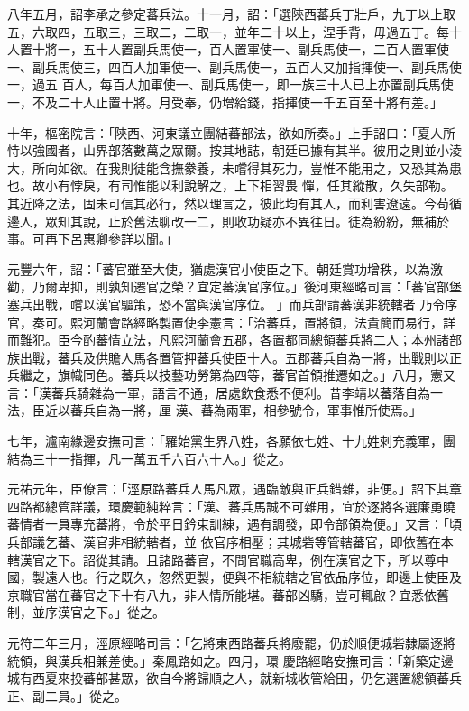 \begin{pinyinscope}
 八年五月，詔李承之參定蕃兵法。十一月，詔：「選陝西蕃兵丁壯戶，九丁以上取五，六取四，五取三，三取二，二取一，並年二十以上，涅手背，毋過五丁。每十人置十將一，五十人置副兵馬使一，百人置軍使一、副兵馬使一，二百人置軍使一、副兵馬使三，四百人加軍使一、副兵馬使一，五百人又加指揮使一、副兵馬使一，過五
 百人，每百人加軍使一、副兵馬使一，即一族三十人已上亦置副兵馬使一，不及二十人止置十將。月受奉，仍增給錢，指揮使一千五百至十將有差。」



 十年，樞密院言：「陝西、河東議立團結蕃部法，欲如所奏。」上手詔曰：「夏人所恃以強國者，山界部落數萬之眾爾。按其地誌，朝廷已據有其半。彼用之則並小淩大，所向如欲。在我則徒能含撫豢養，未嚐得其死力，豈惟不能用之，又恐其為患也。故小有悖戾，有司惟能以利說解之，上下相習畏
 憚，任其縱散，久失部勒。其近降之法，固未可信其必行，然以理言之，彼此均有其人，而利害遼遠。今苟循邊人，眾知其說，止於舊法聊改一二，則收功疑亦不異往日。徒為紛紛，無補於事。可再下呂惠卿參詳以聞。」



 元豐六年，詔：「蕃官雖至大使，猶處漢官小使臣之下。朝廷賞功增秩，以為激勸，乃爾卑抑，則孰知遷官之榮？宜定蕃漢官序位。」後河東經略司言：「蕃官部堡塞兵出戰，嚐以漢官驅策，恐不當與漢官序位。 」而兵部請蕃漢非統轄者
 乃令序官，奏可。熙河蘭會路經略製置使李憲言：「治蕃兵，置將領，法貴簡而易行，詳而難犯。臣今酌蕃情立法，凡熙河蘭會五郡，各置都同總領蕃兵將二人；本州諸部族出戰，蕃兵及供贍人馬各置管押蕃兵使臣十人。五郡蕃兵自為一將，出戰則以正兵繼之，旗幟同色。蕃兵以技藝功勞第為四等，蕃官首領推遷如之。」八月，憲又言：「漢蕃兵騎雜為一軍，語言不通，居處飲食悉不便利。昔李靖以蕃落自為一法，臣近以蕃兵自為一將，厘
 漢、蕃為兩軍，相參號令，軍事惟所使焉。」



 七年，瀘南緣邊安撫司言：「羅始黨生界八姓，各願依七姓、十九姓刺充義軍，團結為三十一指揮，凡一萬五千六百六十人。」從之。



 元祐元年，臣僚言：「涇原路蕃兵人馬凡眾，遇臨敵與正兵錯雜，非便。」詔下其章四路都總管詳議，環慶範純粹言：「漢、蕃兵馬誠不可雜用，宜於逐將各選廉勇曉蕃情者一員專充蕃將，令於平日鈐束訓練，遇有調發，即令部領為便。」又言：「頃兵部議乞蕃、漢官非相統轄者，並
 依官序相壓；其城砦等管轄蕃官，即依舊在本轄漢官之下。詔從其請。且諸路蕃官，不問官職高卑，例在漢官之下，所以尊中國，製遠人也。行之既久，忽然更製，便與不相統轄之官依品序位，即邊上使臣及京職官當在蕃官之下十有八九，非人情所能堪。蕃部凶驕，豈可輒啟？宜悉依舊制，並序漢官之下。」從之。



 元符二年三月，涇原經略司言：「乞將東西路蕃兵將廢罷，仍於順便城砦隸屬逐將統領，與漢兵相兼差使。」秦鳳路如之。四月，環
 慶路經略安撫司言：「新築定邊城有西夏來投蕃部甚眾，欲自今將歸順之人，就新城收管給田，仍乞選置總領蕃兵正、副二員。」從之。



\end{pinyinscope}